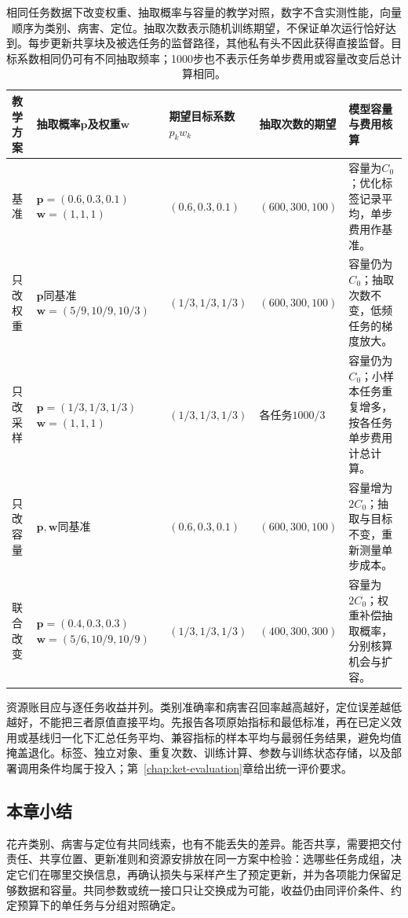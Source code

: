 \begin{table}[htbp]
  \centering
  \small
  \begin{tabularx}{\linewidth}{p{18mm}p{36mm}p{25mm}p{28mm}X}
    \toprule
    教学方案 & 抽取概率$\bm p$及权重$\bm w$ & 期望目标系数$p_kw_k$ & 抽取次数的期望 & 模型容量与费用核算 \\
    \midrule
    基准 &
    $\bm p=(0.6,0.3,0.1)$\newline
    $\bm w=(1,1,1)$ &
    $(0.6,0.3,0.1)$ &
    $(600,300,100)$ &
    容量为$C_0$；优化标签记录平均，单步费用作基准。 \\
    只改权重 &
    $\bm p$同基准\newline
    $\bm w=(5/9,10/9,10/3)$ &
    $(1/3,1/3,1/3)$ &
    $(600,300,100)$ &
    容量仍为$C_0$；抽取次数不变，低频任务的梯度放大。 \\
    只改采样 &
    $\bm p=(1/3,1/3,1/3)$\newline
    $\bm w=(1,1,1)$ &
    $(1/3,1/3,1/3)$ &
    各任务$1000/3$ &
    容量仍为$C_0$；小样本任务重复增多，按各任务单步费用计总计算。 \\
    只改容量 &
    $\bm p,\bm w$同基准 &
    $(0.6,0.3,0.1)$ &
    $(600,300,100)$ &
    容量增为$2C_0$；抽取与目标不变，重新测量单步成本。 \\
    联合改变 &
    $\bm p=(0.4,0.3,0.3)$\newline
    $\bm w=(5/6,10/9,10/9)$ &
    $(1/3,1/3,1/3)$ &
    $(400,300,300)$ &
    容量为$2C_0$；权重补偿抽取概率，分别核算机会与扩容。 \\
    \bottomrule
  \end{tabularx}
  \caption{相同任务数据下改变权重、抽取概率与容量的教学对照，数字不含实测性能，向量顺序为类别、病害、定位。抽取次数表示随机训练期望，不保证单次运行恰好达到。每步更新共享块及被选任务的监督路径，其他私有头不因此获得直接监督。目标系数相同仍可有不同抽取频率；1000步也不表示任务单步费用或容量改变后总计算相同。}
  \label{tab:ket-sharing-resource-controls}
\end{table}

资源账目应与逐任务收益并列。类别准确率和病害召回率越高越好，定位误差越低越好，不能把三者原值直接平均。先报告各项原始指标和最低标准，再在已定义效用或基线归一化下汇总任务平均、兼容指标的样本平均与最弱任务结果，避免均值掩盖退化。标签、独立对象、重复次数、训练计算、参数与训练状态存储，以及部署调用条件均属于投入；第~\ref{chap:ket-evaluation}章给出统一评价要求。

\begin{samepage}
\section{本章小结}
\label{sec:ket-sharing-summary}

花卉类别、病害与定位有共同线索，也有不能丢失的差异。能否共享，需要把交付责任、共享位置、更新准则和资源安排放在同一方案中检验：选哪些任务成组，决定它们在哪里交换信息，再确认损失与采样产生了预定更新，并为各项能力保留足够数据和容量。共同参数或统一接口只让交换成为可能，收益仍由同评价条件、约定预算下的单任务与分组对照确定。

\end{samepage}

